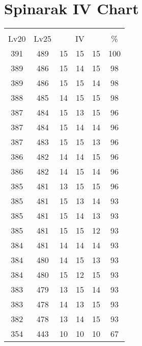 \documentclass{article}%
\begin{document}
%
\normalsize%
\section{Spinarak IV Chart}%
\label{sec:Spinarak IV Chart}%
\renewcommand{\arraystretch}{1.5}%
\begin{tabular}{|c|c|c|c|c|c|}%
\hline%
\multicolumn{6}{|c|}{\textcolor{white}{ 
\linebreak{Spinarak}
}%
\cellcolor{black}}\\%
\multicolumn{1}{|c}{Lv20}&\multicolumn{1}{c|}{Lv25}&\multicolumn{3}{c|}{IV}&\multicolumn{1}{|c|}{\%}\\%
\hline%
\rowcolor{color100}%
391&489&15&15&15&100\\%
\hline%
\rowcolor{color98}%
389&486&15&14&15&98\\%
\hline%
\rowcolor{color98}%
389&486&15&15&14&98\\%
\hline%
\rowcolor{color98}%
388&485&14&15&15&98\\%
\hline%
\rowcolor{color96}%
387&484&15&13&15&96\\%
\hline%
\rowcolor{color96}%
387&484&15&14&14&96\\%
\hline%
\rowcolor{color96}%
387&483&15&15&13&96\\%
\hline%
\rowcolor{color96}%
386&482&14&14&15&96\\%
\hline%
\rowcolor{color96}%
386&482&14&15&14&96\\%
\hline%
\rowcolor{color96}%
385&481&13&15&15&96\\%
\hline%
\rowcolor{color93}%
385&481&15&13&14&93\\%
\hline%
\rowcolor{color93}%
385&481&15&14&13&93\\%
\hline%
\rowcolor{color93}%
385&481&15&15&12&93\\%
\hline%
\rowcolor{color93}%
384&481&14&14&14&93\\%
\hline%
\rowcolor{color93}%
384&480&14&15&13&93\\%
\hline%
\rowcolor{color93}%
384&480&15&12&15&93\\%
\hline%
\rowcolor{color93}%
383&479&13&15&14&93\\%
\hline%
\rowcolor{color93}%
383&478&14&13&15&93\\%
\hline%
\rowcolor{color93}%
382&478&13&14&15&93\\%
\hline%
\rowcolor{color91}%
354&443&10&10&10&67\\%
\end{tabular}

%
\end{document}

